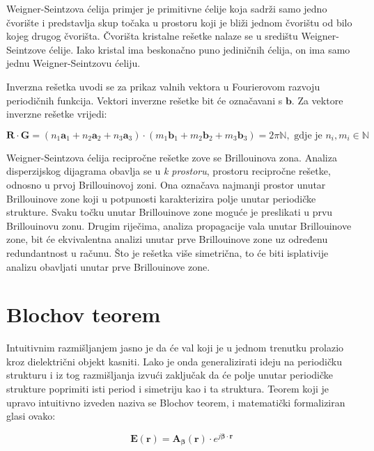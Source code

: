 \documentclass[utf8, seminar, numeric]{fer}
\begin{document}
Weigner-Seintzova ćelija primjer je primitivne ćelije koja sadrži samo jedno
čvorište i predstavlja skup točaka u prostoru koji je bliži jednom čvorištu
od bilo kojeg drugog čvorišta. Čvorišta kristalne rešetke nalaze se u središtu
Weigner-Seintzove ćelije. Iako kristal ima beskonačno puno jediničnih ćelija,
on ima samo jednu Weigner-Seintzovu ćeliju.

Inverzna rešetka uvodi se za prikaz valnih vektora u Fourierovom razvoju
periodičnih funkcija. Vektori inverzne rešetke bit će označavani s $\mathbf{b}$.
Za vektore inverzne rešetke vrijedi:

\begin{equation}
	\mathbf{R} \cdot \mathbf{G} =
	(n_1\mathbf{a}_1 + n_2\mathbf{a}_2 + n_3\mathbf{a}_3)
	\cdot
	(m_1\mathbf{b}_1 + m_2\mathbf{b}_2 + m_3\mathbf{b}_3) = 2 \pi \mathbb{N},
		\text{ gdje je }n_i, m_i \in \mathbb{N}
\end{equation}


Weigner-Seintzova ćelija recipročne rešetke zove se Brillouinova zona. Analiza
disperzijskog dijagrama obavlja se u \textit{k prostoru}, prostoru recipročne
rešetke, odnosno u prvoj Brillouinovoj zoni. Ona označava najmanji
prostor unutar Brillouinove zone koji u potpunosti karakterizira polje unutar
periodičke strukture. Svaku točku unutar Brillouinove zone moguće je preslikati
u prvu Brillouinovu zonu. Drugim riječima, analiza propagacije vala unutar
Brillouinove zone, bit će ekvivalentna analizi unutar prve Brillouinove zone uz
određenu redundantnost u računu. Što je rešetka više simetrična, to će biti
isplativije analizu obavljati unutar prve Brillouinove zone.


\section{Blochov teorem}

Intuitivnim razmišljanjem jasno je da će val koji je u jednom trenutku prolazio
kroz dielektrični objekt kasniti. Lako je onda generalizirati ideju na periodičku
strukturu i iz tog razmišljanja izvući zaključak da će polje unutar periodičke
strukture poprimiti isti period i simetriju kao i ta struktura. Teorem koji je
upravo intuitivno izveden naziva se Blochov teorem, i matematički formaliziran
glasi ovako:

\begin{equation} \label{eq:bloch}
	\mathbf{E}(\mathbf{r}) =
	\mathbf{A}_{\bm{\beta}}(\mathbf{r}) \cdot
		e^{j {\bm{\beta}} \cdot \mathbf{r}}
\end{equation}
\end{document}
